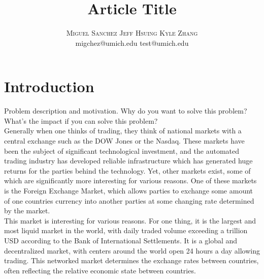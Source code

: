 \documentclass[twoside]{article}
\title{\vspace{-15mm}\fontsize{24pt}{10pt}\selectfont\textbf{Article Title}} %
\author{
\large
\textsc{Miguel Sanchez Jeff Hsuing Kyle Zhang}\\
\normalsize migchez@umich.edu test@umich.edu %
\vspace{-5mm}
}
\date{}
\begin{document}
\maketitle %


\begin{abstract}

\noindent \lipsum[1] %

\end{abstract}


\section{Introduction}

Problem description and motivation. Why do you want to solve this problem? What's the impact if you can solve this problem?\\

Generally when one thinks of trading, they think of national markets with a central exchange such as the DOW Jones or the Nasdaq. These markets have been the subject of significant technological investment, and the automated trading industry has developed reliable infrastructure which has generated huge returns for the parties behind the technology. Yet, other markets exist, some of which are significantly more interesting for various reasons. One of these markets is the Foreign Exchange Market, which allows parties to exchange some amount of one countries currency into another parties at some changing rate determined by the market.\\

This market is interesting for various reasons. For one thing, it is the largest and most liquid market in the world, with daily traded volume exceeding a trillion USD according to the Bank of International Settlements. It is a global and decentralized market, with centers around the world open 24 hours a day allowing trading. This networked market determines the exchange rates between countries, often reflecting the relative economic state between countries.\\
\end{document}
